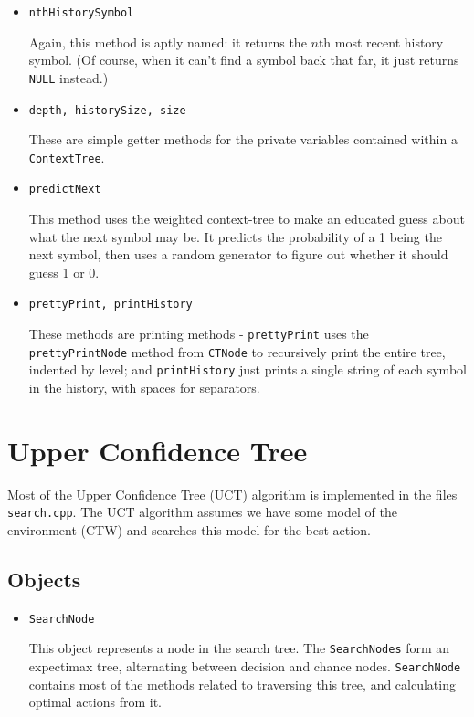 \documentclass[pdftex,twoside,a4paper]{report}
\begin{document}
\begin{itemize}
{    This is a simple getter method for the weighted probability of the root - which is the probability of the entire context tree.
  }
\item{\texttt{nthHistorySymbol}
    
    Again, this method is aptly named: it returns the $n$th most recent history symbol. (Of course, when it can't find a symbol back that far, it just returns \texttt{NULL} instead.)
  }
\item{\texttt{depth, historySize, size}
    
    These are simple getter methods for the private variables contained within a \texttt{ContextTree}.
  }
\item{\texttt{predictNext}
    
    This method uses the weighted context-tree to make an educated guess about what the next symbol may be. It predicts the probability of a 1 being the next symbol, then uses a random generator to figure out whether it should guess 1 or 0.
  }
\item{\texttt{prettyPrint, printHistory}
    
    These methods are printing methods - \texttt{prettyPrint} uses the \texttt{prettyPrintNode} method from \texttt{CTNode} to recursively print the entire tree, indented by level; and \texttt{printHistory} just prints a single string of each symbol in the history, with spaces for separators.
  }
\end{itemize}
\section{Upper Confidence Tree}
Most of the Upper Confidence Tree (UCT) algorithm is implemented in the files \texttt{search.cpp}. The UCT algorithm assumes we have some model of the environment (CTW) and searches this model for the best action.
\subsection{Objects}
\begin{itemize}
	\item{\texttt{SearchNode}
	
	This object represents a node in the search tree. The \texttt{SearchNodes} form an expectimax tree, alternating between decision and chance nodes. \texttt{SearchNode} contains most of the methods related to traversing this tree, and calculating optimal actions from it.
	}
\end{itemize}
\end{document}
